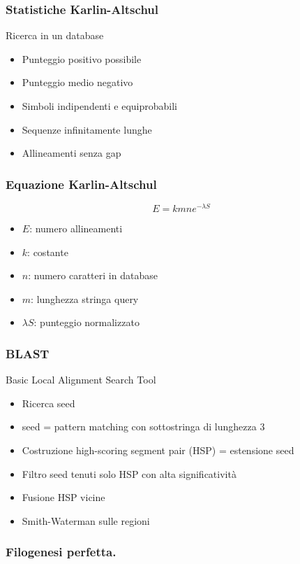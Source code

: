 \begin{frame}[fragile]
\frametitle{Statistiche Karlin-Altschul}
\begin{block}{Ricerca in un database}
\begin{itemize}
\item
Punteggio positivo possibile
\item
Punteggio medio negativo
\item
Simboli indipendenti e equiprobabili
\item
Sequenze infinitamente lunghe
\item
Allineamenti senza gap
\end{itemize}
\end{block}
\end{frame}

\begin{frame}[fragile]
\frametitle{Equazione Karlin-Altschul}
\begin{equation*}
E=kmne^{-\lambda S}
\end{equation*}
\begin{itemize}
\item
$E$: numero allineamenti
\item
$k$: costante
\item
$n$: numero caratteri in database
\item
$m$: lunghezza stringa query
\item
$\lambda S$: punteggio normalizzato
\end{itemize}
\end{frame}

\begin{frame}[fragile]
\frametitle{BLAST}
\begin{block}{Basic Local Alignment Search Tool}
\begin{itemize}
\item
Ricerca seed
\item
seed = pattern matching con sottostringa di lunghezza $3$
\item
Costruzione  high-scoring segment pair (HSP)
= estensione seed
\item
Filtro seed tenuti solo HSP con  alta significatività
\item
Fusione HSP  vicine
\item
Smith-Waterman sulle regioni
\end{itemize}
\end{block}
\end{frame}


\begin{frame}[fragile]
\frametitle{Filogenesi perfetta.}
\end{frame}


